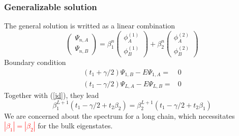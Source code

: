 \documentclass{beamer}
\begin{document}
    \begin{frame}
  \frametitle{Generalizable solution}
  The general solution is writted as a linear combination
  \begin{equation}
  \left(\begin{array}{c}
  \Psi_{n,A} \\ 
  \Psi_{n,B}
  \end{array} \right)=\beta_1^n\left(\begin{array}{c}
  \phi_{A}^{(1)} \\ 
  \phi_{B}^{(1)}
  \end{array}\right)+\beta_2^n\left(\begin{array}{c}
  \phi_{A}^{(2)} \\ 
  \phi_{B}^{(2)}
  \end{array}\right)
  \end{equation}
  Boundary condition
  \begin{equation}
  \begin{aligned}
  (t_1+\gamma/2)\Psi_{1,B}-E\Psi_{1,A}=&0\\
  (t_1-\gamma/2)\Psi_{L,A}-E\Psi_{L,B}=&0
  \end{aligned}
  \end{equation}
  Together with (\ref{jd}), they lead
  \begin{equation}
  \beta_1^{L+1}(t_1-\gamma/2+t_2\beta_2)=\beta_2^{L+1}(t_1-\gamma/2+t_2\beta_1)
  \end{equation}
  We are concerned about the spectrum for a long chain, which necessitates \textcolor{red}{$|\beta_1|=|\beta_2|$} for the bulk eigenstates.
\end{frame}
  
\end{document}
